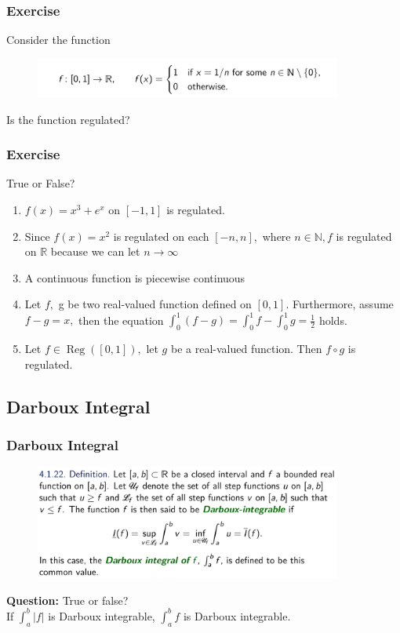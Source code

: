 \documentclass[10pt, t]{beamer}
\begin{document}
\begin{frame}
    \frametitle{Exercise}
    Consider the function
    \begin{figure}[H]
        \centering
        \includegraphics[width=0.9\textwidth]{2020-12-02-12-24-56.png}
    \end{figure}
    Is the function regulated?
\end{frame}

\begin{frame}
    \frametitle{Exercise}
    True or False?
    \begin{enumerate}
        \item $f(x)=x^3+e^x$ on $[-1,1]$ is regulated.
        \item
              Since $f(x)=x^{2}$ is regulated on each $[-n, n],$ where $n \in \mathbb{N}, f$ is regulated on $\mathbb{R}$
              because we can let $n \rightarrow \infty$
        \item A continuous function is piecewise continuous
        \item Let $f,$ g be two real-valued function defined on $[0,1] .$ Furthermore, assume $f-g=x,$ then the equation $\int_{0}^{1}(f-g)=\int_{0}^{1} f-\int_{0}^{1} g=\frac{1}{2}$ holds.
        \item Let $f \in \operatorname{Reg}([0,1]),$ let $g$ be a real-valued function. Then $f \circ g$ is regulated.
    \end{enumerate}
\end{frame}

\subsection{Darboux Integral}
\begin{frame}
    \frametitle{Darboux Integral}
    \begin{figure}[H]
        \centering
        \includegraphics[width=0.9\textwidth]{2020-12-02-12-11-33.png}
    \end{figure}
    \textbf{Question: }True or false?\\
    If $\int_a^b|f|$ is Darboux integrable, $\int_a^b f$ is Darboux integrable.
\end{frame}
\end{document}
